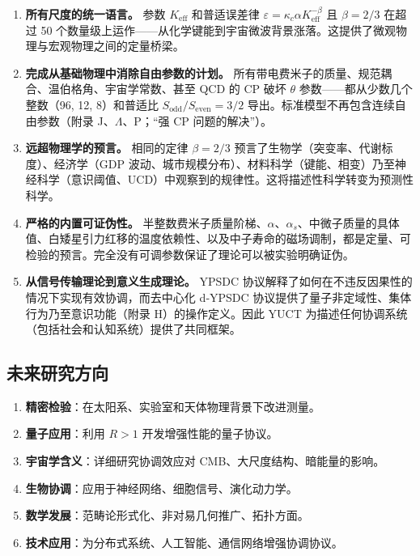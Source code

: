 \documentclass[11pt,a4paper]{article}
\begin{document}
	\begin{enumerate}
		\item \textbf{所有尺度的统一语言。}
		参数 \(K_{\mathrm{eff}}\) 和普适误差律
		\(\varepsilon = \kappa_c \alpha K_{\mathrm{eff}}^{-\beta}\) 且 \(\beta = 2/3\) 在超过 50 个数量级上运作——从化学键能到宇宙微波背景涨落。这提供了微观物理与宏观物理之间的定量桥梁。
		
		\item \textbf{完成从基础物理中消除自由参数的计划。}
		所有带电费米子的质量、规范耦合、温伯格角、宇宙学常数、甚至 QCD 的 CP 破坏 \(\theta\) 参数——都从少数几个整数（96, 12, 8）和普适比 \(S_{\mathrm{odd}}/S_{\mathrm{even}} = 3/2\) 导出。标准模型不再包含连续自由参数（附录 J、\(\Lambda\)、P；“强 CP 问题的解决”）。
		
		\item \textbf{远超物理学的预言。}
		相同的定律 \(\beta = 2/3\) 预言了生物学（突变率、代谢标度）、经济学（GDP 波动、城市规模分布）、材料科学（键能、相变）乃至神经科学（意识阈值、UCD）中观察到的规律性。这将描述性科学转变为预测性科学。
		
		\item \textbf{严格的内置可证伪性。}
		半整数费米子质量阶梯、\(\alpha\)、\(\alpha_s\)、中微子质量的具体值、白矮星引力红移的温度依赖性、以及中子寿命的磁场调制，都是定量、可检验的预言。完全没有可调参数保证了理论可以被实验明确证伪。
		
		\item \textbf{从信号传输理论到意义生成理论。}
		YPSDC 协议解释了如何在不违反因果性的情况下实现有效协调，而去中心化 d‑YPSDC 协议提供了量子非定域性、集体行为乃至意识功能（附录 H）的操作定义。因此 YUCT 为描述任何协调系统（包括社会和认知系统）提供了共同框架。
	\end{enumerate}
	
	\subsection{未来研究方向}
	
	\begin{enumerate}
		\item \textbf{精密检验}：在太阳系、实验室和天体物理背景下改进测量。
		
		\item \textbf{量子应用}：利用 $R>1$ 开发增强性能的量子协议。
		
		\item \textbf{宇宙学含义}：详细研究协调效应对 CMB、大尺度结构、暗能量的影响。
		
		\item \textbf{生物协调}：应用于神经网络、细胞信号、演化动力学。
		
		\item \textbf{数学发展}：范畴论形式化、非对易几何推广、拓扑方面。
		
		\item \textbf{技术应用}：为分布式系统、人工智能、通信网络增强协调协议。
	\end{enumerate}
	
\end{document}
